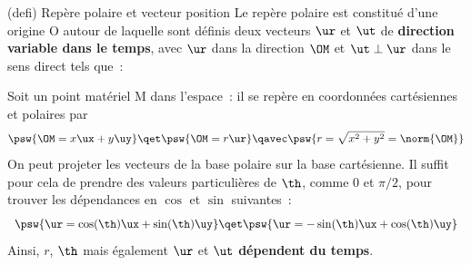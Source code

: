 \documentclass[../../main/main.tex]{subfiles}
\begin{document}
\begin{tcb*}[sidebyside, righthand ratio=.35](defi)
	{Repère polaire et vecteur position}
	Le repère polaire est constitué d'une origine O autour de laquelle sont
	définis deux vecteurs $\ur$ et $\ut$ de \textbf{direction
		variable dans le temps}, avec $\ur$ dans la direction $\OM$ et $\ut
		\perp \ur$ dans le sens direct tels que~:
	\psw{
		\[
			\boxed{\OM = r\ur}
			\qet
			\boxed{\norm{\OM} = r}
		\]
	}
	\tcblower
	\begin{center}
		\vspace{-15pt}
	\end{center}
\end{tcb*}

Soit un point matériel M dans l'espace~: il se repère en coordonnées
cartésiennes et polaires par
\[
	\psw{\OM = x\ux + y\uy}
	\qet
	\psw{\OM = r\ur}
	\qavec
	\psw{r = \sqrt{x^2+y^2} = \norm{\OM}}
\]
On peut projeter les vecteurs de la base polaire sur la base cartésienne. Il
suffit pour cela de prendre des valeurs particulières de $\th$, comme 0 et
$\pi/2$, pour trouver les dépendances en $\cos$ et $\sin$ suivantes~:
\[
	\psw{\ur = \cos(\th)\ux + \sin(\th)\uy}
	\qet
	\psw{\ur = -\sin(\th)\ux + \cos(\th)\uy}
\]
Ainsi, $r$, $\th$ mais également $\ur$ et $\ut$ \textbf{dépendent du temps}.
\end{document}
